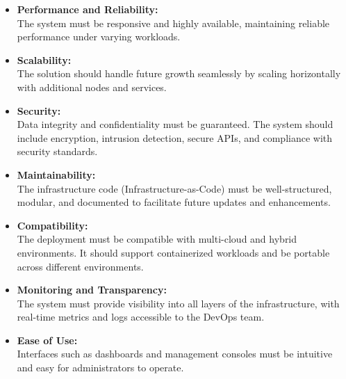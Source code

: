 \documentclass[a4paper,12pt]{report}
\begin{document}
\begin{itemize}
    \item \textbf{Performance and Reliability:} \\  
    The system must be responsive and highly available, maintaining reliable performance under varying workloads.

    \item \textbf{Scalability:} \\  
    The solution should handle future growth seamlessly by scaling horizontally with additional nodes and services.

    \item \textbf{Security:} \\  
    Data integrity and confidentiality must be guaranteed. The system should include encryption, intrusion detection, secure APIs, and compliance with security standards.

    \item \textbf{Maintainability:} \\  
    The infrastructure code (Infrastructure-as-Code) must be well-structured, modular, and documented to facilitate future updates and enhancements.

    \item \textbf{Compatibility:} \\  
    The deployment must be compatible with multi-cloud and hybrid environments. It should support containerized workloads and be portable across different environments.

    \item \textbf{Monitoring and Transparency:} \\  
    The system must provide visibility into all layers of the infrastructure, with real-time metrics and logs accessible to the DevOps team.

    \item \textbf{Ease of Use:} \\  
    Interfaces such as dashboards and management consoles must be intuitive and easy for administrators to operate.
\end{itemize}
\end{document}
